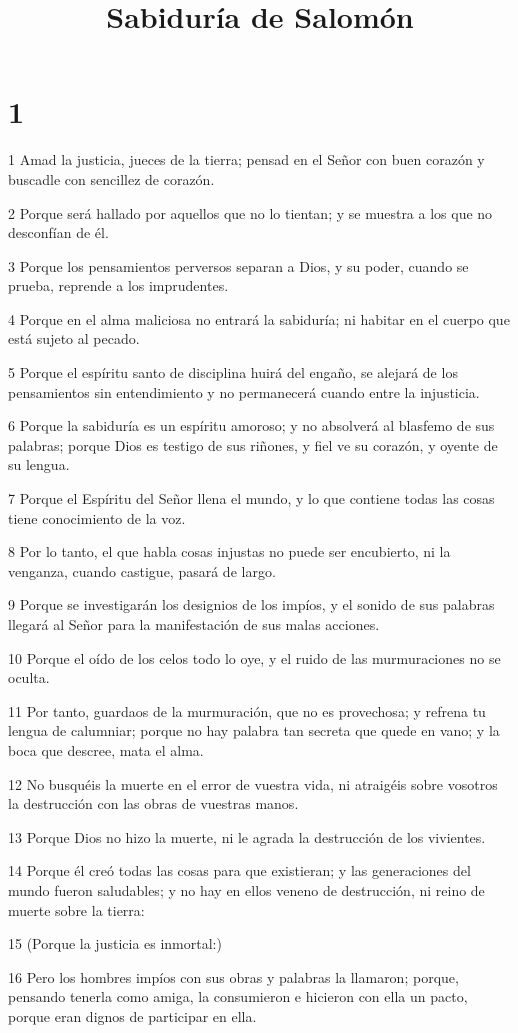 

\title{Sabiduría de Salomón}


\chapter{1}

\par 1 Amad la justicia, jueces de la tierra; pensad en el Señor con buen corazón y buscadle con sencillez de corazón.
\par 2 Porque será hallado por aquellos que no lo tientan; y se muestra a los que no desconfían de él.
\par 3 Porque los pensamientos perversos separan a Dios, y su poder, cuando se prueba, reprende a los imprudentes.
\par 4 Porque en el alma maliciosa no entrará la sabiduría; ni habitar en el cuerpo que está sujeto al pecado.
\par 5 Porque el espíritu santo de disciplina huirá del engaño, se alejará de los pensamientos sin entendimiento y no permanecerá cuando entre la injusticia.
\par 6 Porque la sabiduría es un espíritu amoroso; y no absolverá al blasfemo de sus palabras; porque Dios es testigo de sus riñones, y fiel ve su corazón, y oyente de su lengua.
\par 7 Porque el Espíritu del Señor llena el mundo, y lo que contiene todas las cosas tiene conocimiento de la voz.
\par 8 Por lo tanto, el que habla cosas injustas no puede ser encubierto, ni la venganza, cuando castigue, pasará de largo.
\par 9 Porque se investigarán los designios de los impíos, y el sonido de sus palabras llegará al Señor para la manifestación de sus malas acciones.
\par 10 Porque el oído de los celos todo lo oye, y el ruido de las murmuraciones no se oculta.
\par 11 Por tanto, guardaos de la murmuración, que no es provechosa; y refrena tu lengua de calumniar; porque no hay palabra tan secreta que quede en vano; y la boca que descree, mata el alma.
\par 12 No busquéis la muerte en el error de vuestra vida, ni atraigéis sobre vosotros la destrucción con las obras de vuestras manos.
\par 13 Porque Dios no hizo la muerte, ni le agrada la destrucción de los vivientes.
\par 14 Porque él creó todas las cosas para que existieran; y las generaciones del mundo fueron saludables; y no hay en ellos veneno de destrucción, ni reino de muerte sobre la tierra:
\par 15 (Porque la justicia es inmortal:)
\par 16 Pero los hombres impíos con sus obras y palabras la llamaron; porque, pensando tenerla como amiga, la consumieron e hicieron con ella un pacto, porque eran dignos de participar en ella.

